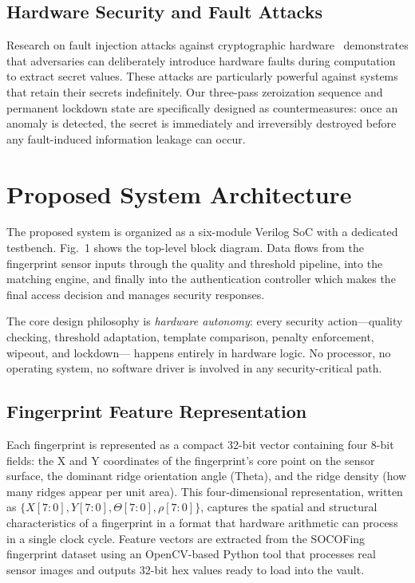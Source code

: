 \documentclass[conference]{IEEEtran}
\begin{document}
\subsection{Hardware Security and Fault Attacks}

Research on fault injection attacks against cryptographic
hardware~\cite{fault_attack} demonstrates that adversaries can
deliberately introduce hardware faults during computation to
extract secret values. These attacks are particularly powerful against
systems that retain their secrets indefinitely. Our three-pass
zeroization sequence and permanent lockdown state are specifically
designed as countermeasures: once an anomaly is detected, the secret
is immediately and irreversibly destroyed before any fault-induced
information leakage can occur.

\section{Proposed System Architecture}

The proposed system is organized as a six-module Verilog SoC with a
dedicated testbench. Fig.~1 shows the top-level block diagram. Data
flows from the fingerprint sensor inputs through the quality and
threshold pipeline, into the matching engine, and finally into the
authentication controller which makes the final access decision and
manages security responses.

The core design philosophy is \textit{hardware autonomy}: every
security action---quality checking, threshold adaptation,
template comparison, penalty enforcement, wipeout, and lockdown---
happens entirely in hardware logic. No processor, no operating system,
no software driver is involved in any security-critical path.

\subsection{Fingerprint Feature Representation}

Each fingerprint is represented as a compact 32-bit vector containing
four 8-bit fields: the X and Y coordinates of the fingerprint's core
point on the sensor surface, the dominant ridge orientation angle
(Theta), and the ridge density (how many ridges appear per unit area).
This four-dimensional representation, written as
$\{X[7:0], Y[7:0], \Theta[7:0], \rho[7:0]\}$,
captures the spatial and structural characteristics of a fingerprint
in a format that hardware arithmetic can process in a single clock
cycle. Feature vectors are extracted from the SOCOFing fingerprint
dataset using an OpenCV-based Python tool that processes real sensor
images and outputs 32-bit hex values ready to load into the vault.
\end{document}
